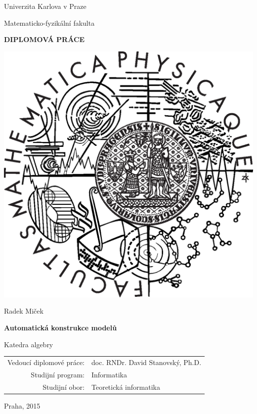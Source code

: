 \documentclass{cs-dipl}
\begin{document}
\renewcommand\thepage{Titulni strana}
\pagestyle{empty}

\begin{center}

\large
\vspace*{5mm}

Univerzita Karlova v Praze

\vspace{1mm}

Matematicko-fyzikální fakulta

\vspace{5mm}

{\Large\bf DIPLOMOVÁ PRÁCE}

\vspace{10mm}

\includegraphics[scale=0.4]{logo.eps}

\vspace{15mm}

{\Large Radek Miček}

\vspace{5mm}
{\LARGE\bf Automatická konstrukce modelů}

\vspace{5mm}
Katedra algebry

\vspace{15mm}

\begin{tabular}{rl}
Vedoucí diplomové práce: & doc. RNDr. David Stanovský, Ph.D.\\
\noalign{\vspace{8mm}}
Studijní program:        & Informatika \\
\noalign{\vspace{3mm}}
Studijní obor:           & Teoretická informatika\\
\end{tabular}

\vspace{26mm}

Praha, 2015
\end{center}
\end{document}
